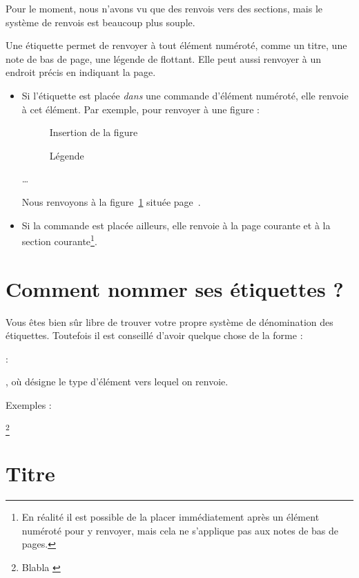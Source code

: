 Pour le moment, nous n'avons vu que des renvois vers des sections, mais le système de renvois est beaucoup plus souple.

Une étiquette permet de renvoyer à tout élément numéroté, comme un titre, une note de bas de page, une légende de flottant. Elle peut aussi renvoyer à un endroit précis en indiquant la page.

\begin{itemize}
\item Si l'étiquette  est placée \emph{dans}  une commande  d'élément numéroté, elle renvoie à cet élément. Par exemple, pour renvoyer à une figure :

\begin{latexcode}
\begin{figure}[paramètre de placement]
    Insertion de la figure
    \caption{Légende\label{figure}}
\end{figure} 
…

Nous renvoyons à la figure~\ref{figure} située page~\pageref{figure}.
\end{latexcode}

\item Si la commande est placée ailleurs, elle renvoie à la page courante et à la section courante\footnote{En réalité il est possible de la placer immédiatement après un élément numéroté pour y renvoyer, mais cela ne s'applique pas aux notes de bas de pages.}.
\end{itemize}

\section{Comment nommer ses étiquettes ?}

Vous êtes bien sûr libre de trouver votre propre système de dénomination des étiquettes. Toutefois il est conseillé d'avoir quelque chose de la forme : \begin{english}:\end{english}, où  désigne le type d'élément vers lequel on renvoie.

Exemples :

\begin{english}
\begin{latexcode}
\footnote{Blabla \label{note:nom}}
\section{Titre \label{section:nom}}
\end{latexcode}
\end{english}


